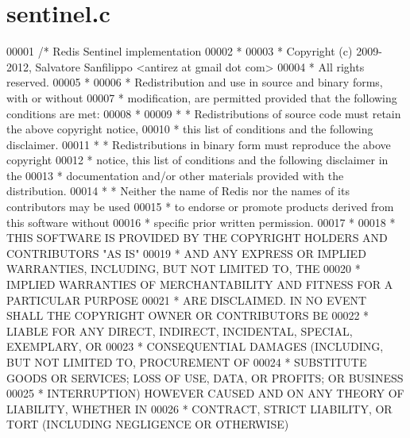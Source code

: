 \hypertarget{sentinel_8c_source}{}\section{sentinel.\+c}
\label{sentinel_8c_source}

\begin{DoxyCode}
00001 \textcolor{comment}{/* Redis Sentinel implementation}
00002 \textcolor{comment}{ *}
00003 \textcolor{comment}{ * Copyright (c) 2009-2012, Salvatore Sanfilippo <antirez at gmail dot com>}
00004 \textcolor{comment}{ * All rights reserved.}
00005 \textcolor{comment}{ *}
00006 \textcolor{comment}{ * Redistribution and use in source and binary forms, with or without}
00007 \textcolor{comment}{ * modification, are permitted provided that the following conditions are met:}
00008 \textcolor{comment}{ *}
00009 \textcolor{comment}{ *   * Redistributions of source code must retain the above copyright notice,}
00010 \textcolor{comment}{ *     this list of conditions and the following disclaimer.}
00011 \textcolor{comment}{ *   * Redistributions in binary form must reproduce the above copyright}
00012 \textcolor{comment}{ *     notice, this list of conditions and the following disclaimer in the}
00013 \textcolor{comment}{ *     documentation and/or other materials provided with the distribution.}
00014 \textcolor{comment}{ *   * Neither the name of Redis nor the names of its contributors may be used}
00015 \textcolor{comment}{ *     to endorse or promote products derived from this software without}
00016 \textcolor{comment}{ *     specific prior written permission.}
00017 \textcolor{comment}{ *}
00018 \textcolor{comment}{ * THIS SOFTWARE IS PROVIDED BY THE COPYRIGHT HOLDERS AND CONTRIBUTORS "AS IS"}
00019 \textcolor{comment}{ * AND ANY EXPRESS OR IMPLIED WARRANTIES, INCLUDING, BUT NOT LIMITED TO, THE}
00020 \textcolor{comment}{ * IMPLIED WARRANTIES OF MERCHANTABILITY AND FITNESS FOR A PARTICULAR PURPOSE}
00021 \textcolor{comment}{ * ARE DISCLAIMED. IN NO EVENT SHALL THE COPYRIGHT OWNER OR CONTRIBUTORS BE}
00022 \textcolor{comment}{ * LIABLE FOR ANY DIRECT, INDIRECT, INCIDENTAL, SPECIAL, EXEMPLARY, OR}
00023 \textcolor{comment}{ * CONSEQUENTIAL DAMAGES (INCLUDING, BUT NOT LIMITED TO, PROCUREMENT OF}
00024 \textcolor{comment}{ * SUBSTITUTE GOODS OR SERVICES; LOSS OF USE, DATA, OR PROFITS; OR BUSINESS}
00025 \textcolor{comment}{ * INTERRUPTION) HOWEVER CAUSED AND ON ANY THEORY OF LIABILITY, WHETHER IN}
00026 \textcolor{comment}{ * CONTRACT, STRICT LIABILITY, OR TORT (INCLUDING NEGLIGENCE OR OTHERWISE)}

\end{DoxyCode}
